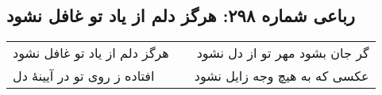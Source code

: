 \begin{center}
\section*{رباعی شماره ۲۹۸: هرگز دلم از یاد تو غافل نشود}
\label{sec:sh298}
\begin{longtable}{l p{0.5cm} r}
هرگز دلم از یاد تو غافل نشود
&&
گر جان بشود مهر تو از دل نشود
\\
افتاده ز روی تو در آیینهٔ دل
&&
عکسی که به هیچ وجه زایل نشود
\\
\end{longtable}
\end{center}
